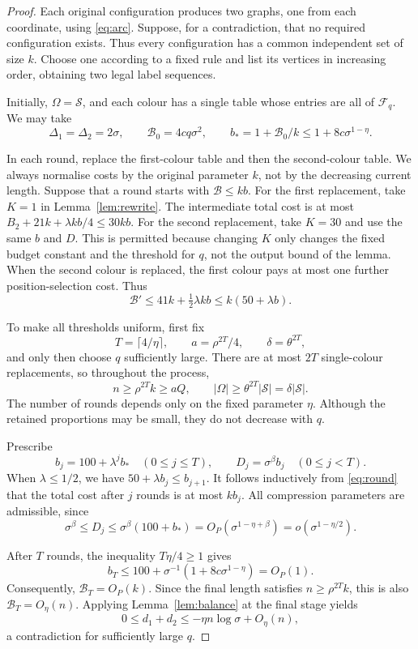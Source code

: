 \documentclass[11pt]{article}
\theoremstyle{definition}
\theoremstyle{remark}
\newcommand{\F}{\mathcal F_q}
\newcommand{\BB}{\mathcal B}
\newcommand{\SSS}{\mathscr S}
\begin{document}
\begin{proof}
Each original configuration produces two graphs, one from each
coordinate, using \eqref{eq:arc}. Suppose, for a contradiction, that
no required configuration exists. Thus every configuration has a
common independent set of size $k$. Choose one according to a fixed
rule and list its vertices in increasing order, obtaining two legal
label sequences.

Initially, $\Omega=\SSS$, and each colour has a single table whose
entries are all of $\F$. We may take
\[
 \Delta_1=\Delta_2=2\sigma,\qquad
 \BB_0=4cq\sigma^2,\qquad
 b_*=1+\BB_0/k\le1+8c\sigma^{1-\eta}.
\]

In each round, replace the first-colour table and then the second-colour
table. We always normalise costs by the original parameter $k$, not by
the decreasing current length. Suppose that a round starts with
$\BB\le kb$. For the first replacement, take $K=1$ in
Lemma~\ref{lem:rewrite}. The intermediate total cost is at most
$B_2+21k+\lambda kb/4\le30kb$. For the second replacement, take $K=30$
and use the same $b$ and $D$. This is permitted because changing $K$
only changes the fixed budget constant and the threshold for $q$, not
the output bound of the lemma. When the second colour is replaced, the
first colour pays at most one further position-selection cost. Thus
\begin{equation}\label{eq:round}
 \BB'\le41k+\tfrac12\lambda kb\le k(50+\lambda b).
\end{equation}

To make all thresholds uniform, first fix
\[
 T=\lceil4/\eta\rceil,\qquad
 a=\rho^{2T}/4,\qquad \delta=\theta^{2T},
\]
and only then choose $q$ sufficiently large. There are at most $2T$
single-colour replacements, so throughout the process,
\[
 n\ge\rho^{2T}k\ge aQ,\qquad
 |\Omega|\ge\theta^{2T}|\SSS|=\delta|\SSS|.
\]
The number of rounds depends only on the fixed parameter $\eta$.
Although the retained proportions may be small, they do not decrease
with $q$.

Prescribe
\[
 b_j=100+\lambda^j b_*\quad(0\le j\le T),\qquad
 D_j=\sigma^\beta b_j\quad(0\le j<T).
\]
When $\lambda\le1/2$, we have $50+\lambda b_j\le b_{j+1}$. It follows
inductively from \eqref{eq:round} that the total cost after $j$ rounds
is at most $kb_j$. All compression parameters are admissible, since
\[
 \sigma^\beta\le D_j\le\sigma^\beta(100+b_*)
 =O_P(\sigma^{1-\eta+\beta})
 =o(\sigma^{1-\eta/2}).
\]

After $T$ rounds, the inequality $T\eta/4\ge1$ gives
\[
 b_T\le100+\sigma^{-1}(1+8c\sigma^{1-\eta})=O_P(1).
\]
Consequently, $\BB_T=O_P(k)$. Since the final length satisfies
$n\ge\rho^{2T}k$, this is also $\BB_T=O_\eta(n)$. Applying
Lemma~\ref{lem:balance} at the final stage yields
\[
 0\le d_1+d_2\le-\eta n\log\sigma+O_\eta(n),
\]
a contradiction for sufficiently large $q$.
\end{proof}
\end{document}
